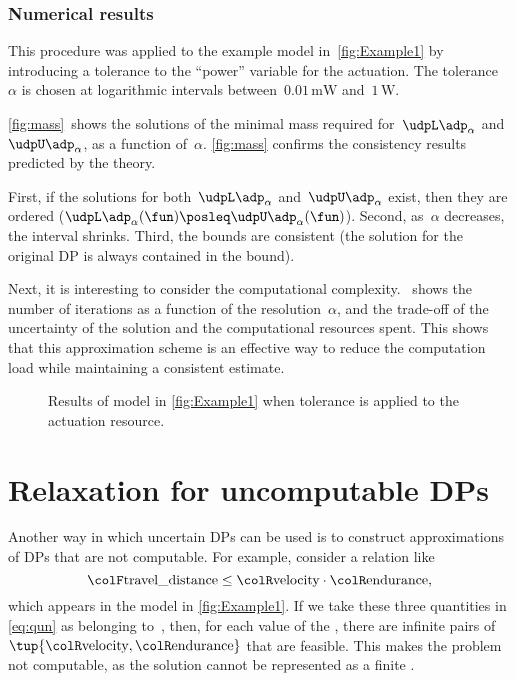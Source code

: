 \subsubsection{Numerical results}

This procedure was applied to the example model in~\cref{fig:Example1} by introducing a tolerance to the ``power'' variable for the actuation.
The tolerance~$\alpha$ is chosen at logarithmic intervals between~$0.01\,\text{mW}$ and~$1\,\text{W}$.

\cref{fig:mass}~shows the solutions of the minimal mass required for~$\udpL\adp_{\alpha}$ and~$\udpU\adp_{\alpha}$, as a function of~$\alpha$. \cref{fig:mass} confirms the consistency results predicted by the theory.

First, if the solutions for both~$\udpL\adp_{\alpha}$ and~$\udpU\adp_{\alpha}$ exist, then they are ordered ($\udpL\adp_{\alpha}(\fun)\posleq\udpU\adp_{\alpha}(\fun)$).
Second, as~$\alpha$ decreases, the interval shrinks.
Third, the bounds are consistent (the solution for the original DP is always contained in the bound).

Next, it is interesting to consider the computational complexity.
~shows the number of iterations as a function of the resolution~$\alpha$, and the trade-off of the uncertainty of the solution and the computational resources spent.
This shows that this approximation scheme is an effective way to reduce the computation load while maintaining a consistent estimate.

\vfill
\begin{figure}[h]
    \caption{
        Results of model in \cref{fig:Example1} when tolerance is applied to the actuation  resource.
    }
\end{figure}

\section[Uncomputable DPs]{Relaxation for uncomputable DPs}
\label{sec:Application-relax}

Another way in which uncertain DPs can be used is to construct approximations of DPs that are not computable.
For example, consider a relation like
%
\begin{equation}
    \label{eq:qun}
    {\colF\text{travel\_distance}}
    \leq{\colR\text{velocity}}\cdot{\colR\text{endurance}},
\end{equation}
%
which appears in the model in \cref{fig:Example1}.
If we take these three quantities in \cref{eq:qun} as belonging to~\reals, then, for each value of the , there are infinite pairs of~$\tup{ {\colR\text{velocity}},{\colR\text{endurance}}} $ that are feasible.
This makes the problem not computable, as the solution cannot be represented as a finite .

